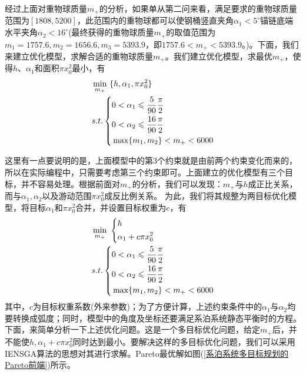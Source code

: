            \par
            经过上面对重物球质量$m_+$的分析，如果单从第二问来看，满足要求的重物球质量范围为$[1808,5200]$，此范围内的重物球都可以使钢桶竖直夹角$\alpha_1 <5^\circ$锚链底端水平夹角$\alpha_2 <16^\circ$(最终获得的重物球质量$m_+$的取值范围为$ m_1= 1757.6, m_2=1656.6, m_3=5393.9$，即$1757.6<m_+<5393.9$。)。下面，我们来建立优化模型，求解合适的重物球质量$m_+$。我们建立优化模型，求最优$m_+$，使得$h$、$\alpha_1$和面积$\pi x_0^2$最小，有
            \begin{align}
            \label{系泊系统优化模型1}
            & \min_{m_+} \ \{h,\alpha_1,\pi x_0^2\}\\
            & s.t.\left\{
            \begin{aligned}
            & 0 < \alpha_1 \leqslant \frac{5}{90}\frac{\pi}{2}\\
            & 0 < \alpha_2 \leqslant \frac{16}{90}\frac{\pi}{2}\\
            & \max\{m_1,m_2\} < m_+ < 6000
            \end{aligned}
            \right.\notag
            \end{align}
            \par
            这里有一点要说明的是，上面模型中的第3个约束就是由前两个约束变化而来的，所以在实际编程中，只需要考虑第三个约束即可。上面建立的优化模型有三个目标，并不容易处理。根据前面对$m_+$的分析，我们可以发现：$m_+$与$h$成正比关系，而与$\alpha_1,\alpha_2$以及游动范围$\pi x_0^2$成反比例关系。
            为此，我们将其规整为两目标优化模型，将目标$\alpha_1$和$\pi x_0^2$合并，并设置目标权重为$c$，有
            \begin{align}
            \label{系泊系统优化模型2}
            & \min_{m_+}\ \left\{
            \begin{aligned}
            & h\\
            & \alpha_1+c\pi x_0^2
            \end{aligned}
            \right.\\
            & s.t.\left\{
            \begin{aligned}
            & 0 < \alpha_1 \leqslant \frac{5}{90}\frac{\pi}{2}\\
            & 0 < \alpha_2 \leqslant \frac{16}{90}\frac{\pi}{2}\\
            & \max\{m_1,m_2\} < m_+ < 6000
            \end{aligned}
            \right.\notag
            \end{align}
            其中，$c$为目标权重系数(外来参数)；为了方便计算，上述约束条件中的$\alpha_1$与$\alpha_2$均要转换成弧度；同时，模型中的角度及坐标还要满足系泊系统静态平衡时的方程。下面，来简单分析一下上述优化问题。这是一个多目标优化问题，给定$m_+$后，并不能使$h,\alpha_1+c\pi x_0^2$同时达到最小。要解决这样的多目标优化问题，我们可以采用IENSGA算法的思想对其进行求解。Pareto最优解如图(\ref{系泊系统多目标规划的Pareto前端})所示。
